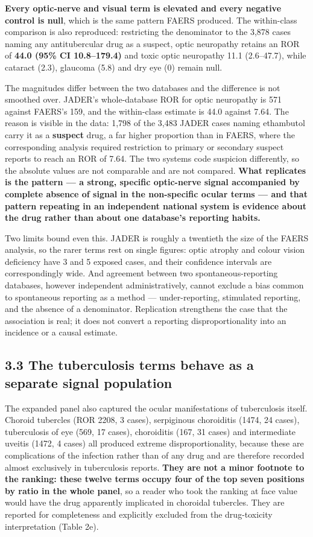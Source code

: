 \documentclass[utf8]{FrontiersinVancouver}
\begin{document}
\textbf{Every optic-nerve and visual term is elevated and every negative control is null}, which is the same pattern FAERS produced. The within-class comparison is also reproduced: restricting the denominator to the 3,878 cases naming any antitubercular drug as a suspect, optic neuropathy retains an ROR of \textbf{44.0 (95\% CI 10.8--179.4)} and toxic optic neuropathy 11.1 (2.6--47.7), while cataract (2.3), glaucoma (5.8) and dry eye (0) remain null.

The magnitudes differ between the two databases and the difference is not smoothed over. JADER's whole-database ROR for optic neuropathy is 571 against FAERS's 159, and the within-class estimate is 44.0 against 7.64. The reason is visible in the data: 1,798 of the 3,483 JADER cases naming ethambutol carry it as a \textbf{suspect} drug, a far higher proportion than in FAERS, where the corresponding analysis required restriction to primary or secondary suspect reports to reach an ROR of 7.64. The two systems code suspicion differently, so the absolute values are not comparable and are not compared. \textbf{What replicates is the pattern --- a strong, specific optic-nerve signal accompanied by complete absence of signal in the non-specific ocular terms --- and that pattern repeating in an independent national system is evidence about the drug rather than about one database's reporting habits.}

Two limits bound even this. JADER is roughly a twentieth the size of the FAERS analysis, so the rarer terms rest on single figures: optic atrophy and colour vision deficiency have 3 and 5 exposed cases, and their confidence intervals are correspondingly wide. And agreement between two spontaneous-reporting databases, however independent administratively, cannot exclude a bias common to spontaneous reporting as a method --- under-reporting, stimulated reporting, and the absence of a denominator. Replication strengthens the case that the association is real; it does not convert a reporting disproportionality into an incidence or a causal estimate.

\subsection{3.3 The tuberculosis terms behave as a separate signal population}

The expanded panel also captured the ocular manifestations of tuberculosis itself. Choroid tubercles (ROR 2208, 3 cases), serpiginous choroiditis (1474, 24 cases), tuberculosis of eye (569, 17 cases), choroiditis (167, 31 cases) and intermediate uveitis (1472, 4 cases) all produced extreme disproportionality, because these are complications of the infection rather than of any drug and are therefore recorded almost exclusively in tuberculosis reports. \textbf{They are not a minor footnote to the ranking: these twelve terms occupy four of the top seven positions by ratio in the whole panel}, so a reader who took the ranking at face value would have the drug apparently implicated in choroidal tubercles. They are reported for completeness and explicitly excluded from the drug-toxicity interpretation (Table 2e).
\end{document}

